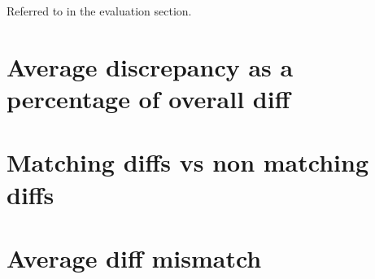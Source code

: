 Referred to in the evaluation section.

\section{Average discrepancy as a percentage of overall diff}


\section{Matching diffs vs non matching diffs}


\section{Average diff mismatch}

